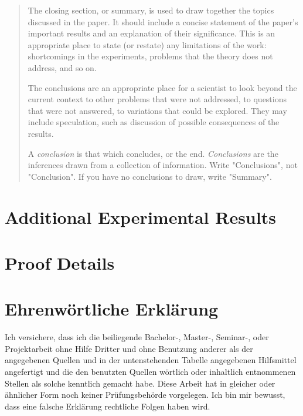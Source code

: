 \documentclass[a4paper,oneside,bibliography=totoc]{scrartcl}
\begin{document}
\blockcquote{zobel2004}{%
  The closing section, or summary, is used to draw together the topics discussed
  in the paper. It should include a concise statement of the paper's important
  results and an explanation of their significance. This is an appropriate place
  to state (or restate) any limitations of the work: shortcomings in the
  experiments, problems that the theory does not address, and so on.

  The conclusions are an appropriate place for a scientist to look beyond the
  current context to other problems that were not addressed, to questions that
  were not answered, to variations that could be explored. They may include
  speculation, such as discussion of possible consequences of the results.

  A \emph{conclusion} is that which concludes, or the end. \emph{Conclusions}
  are the inferences drawn from a collection of information. Write
  "Conclusions", not "Conclusion". If you have no conclusions to draw, write
  "Summary".}




\appendix
\section{Additional Experimental Results}


\section{Proof Details}


\clearpage
\section*{Ehrenwörtliche Erklärung}

Ich versichere, dass ich die beiliegende Bachelor-, Master-, Seminar-, oder
Projektarbeit ohne Hilfe Dritter und ohne Benutzung anderer als der angegebenen
Quellen und in der untenstehenden Tabelle angegebenen Hilfsmittel angefertigt
und die den benutzten Quellen wörtlich oder inhaltlich entnommenen Stellen als
solche kenntlich gemacht habe. Diese Arbeit hat in gleicher oder ähnlicher Form
noch keiner Prüfungsbehörde vorgelegen. Ich bin mir bewusst, dass eine falsche
Erklärung rechtliche Folgen haben wird.
\end{document}

